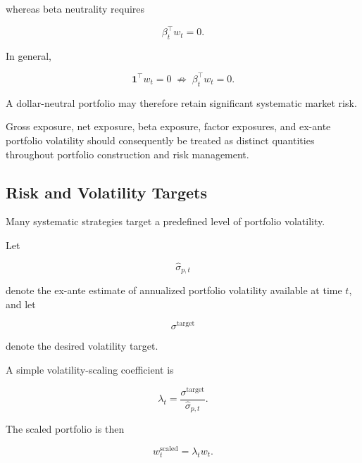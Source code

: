 \documentclass[11pt,a4paper]{article}
\begin{document}
whereas beta neutrality requires

\begin{equation}
\beta_t^\top w_t
=
0.
\end{equation}

In general,

\begin{equation}
\boxed{
\mathbf{1}^\top w_t=0
\;\not\Rightarrow\;
\beta_t^\top w_t=0.
}
\end{equation}

A dollar-neutral portfolio may therefore retain significant systematic market
risk.

Gross exposure, net exposure, beta exposure, factor exposures, and ex-ante
portfolio volatility should consequently be treated as distinct quantities
throughout portfolio construction and risk management.


\subsection{Risk and Volatility Targets}
\label{subsec:volatility_target}

Many systematic strategies target a predefined level of portfolio volatility.

Let

\begin{equation}
\widehat{\sigma}_{p,t}
\end{equation}

denote the ex-ante estimate of annualized portfolio volatility available at
time $t$, and let

\begin{equation}
\sigma^{\mathrm{target}}
\end{equation}

denote the desired volatility target.

A simple volatility-scaling coefficient is

\begin{equation}
\lambda_t
=
\frac{
\sigma^{\mathrm{target}}
}{
\widehat{\sigma}_{p,t}
}.
\end{equation}

The scaled portfolio is then

\begin{equation}
\boxed{
w_t^{\mathrm{scaled}}
=
\lambda_t w_t.
}
\end{equation}
\end{document}
